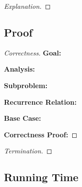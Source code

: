 \documentclass[openany]{article}
\begin{document}
\begin{proof}[Explanation]{}
		\renewcommand{\qedsymbol}{} %
       
\end{proof}

\subsection*{Proof}
\begin{proof}[Correctness]{}
    
    
\textbf{Goal:} 

\textbf{Analysis:} 
    
\textbf{Subproblem:}

    
\textbf{Recurrence Relation:}
    
    
\textbf{Base Case:}
    
    
\textbf{Correctness Proof:}

    
  

\end{proof}
\begin{proof}[Termination]{}

\end{proof}

\subsection*{Running Time}
\end{document}
